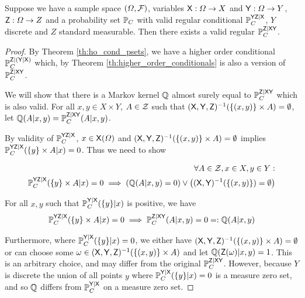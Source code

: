 \begin{theorem}
Suppose we have a sample space $(\Omega,\mathcal{F})$, variables $\mathsf{X}:\Omega\to X$ and $\mathsf{Y}:\Omega\to Y$, $\mathsf{Z}:\Omega\to Z$ and a probability set $\mathbb{P}_C$ with valid regular conditional $\mathbb{P}_C^{\mathsf{YZ}|\mathsf{X}}$, $Y$ discrete and $Z$ standard measurable. Then there exists a valid regular $\mathbb{P}_C^{\mathsf{Z}|\mathsf{XY}}$.
\end{theorem}

\begin{proof}
By Theorem \ref{th:ho_cond_psets}, we have a higher order conditional $\mathbb{P}_C^{\mathsf{Z}|(\mathsf{Y}|\mathsf{X})}$ which, by Theorem \ref{th:higher_order_conditionals} is also a version of $\mathbb{P}_C^{\mathsf{Z}|\mathsf{XY}}$.

We will show that there is a Markov kernel $\mathbb{Q}$ almost surely equal to $\mathbb{P}_C^{\mathsf{Z}|\mathsf{XY}}$ which is also valid. For all $x,y\in X\times Y$, $A\in\mathcal{Z}$ such that $(\mathsf{X},\mathsf{Y},\mathsf{Z})^{-1}(\{(x,y)\}\times A)=\emptyset$, let $\mathbb{Q}(A|x,y)=\mathbb{P}_C^{\mathsf{Z}|\mathsf{XY}}(A|x,y)$.

By validity of $\mathbb{P}_C^{\mathsf{YZ}|\mathsf{X}}$, $x\in \mathsf{X}(\Omega)$ and $(\mathsf{X},\mathsf{Y},\mathsf{Z})^{-1}(\{(x,y)\}\times A)=\emptyset$ implies $\mathbb{P}_C^{\mathsf{YZ}|\mathsf{X}}(\{y\}\times A|x)=0$. Thus we need to show

\begin{align}
    \forall A\in \mathcal{Z}, x\in X, y\in Y:\\ \mathbb{P}_C^{\mathsf{YZ}|\mathsf{X}}(\{y\}\times A|x)=0 \implies \left(\mathbb{Q}(A|x,y) = 0\right) \lor \left((\mathsf{X},\mathsf{Y})^{-1}(\{(x,y)\}) = \emptyset\right)
\end{align}

For all $x,y$ such that $\mathbb{P}_{C}^{\mathsf{Y}|\mathsf{X}}(\{y\}|x)$ is positive, we have
\begin{align}
    \mathbb{P}_C^{\mathsf{YZ}|\mathsf{X}}(\{y\}\times A|x)=0\implies \mathbb{P}_C^{\mathsf{Z}|\mathsf{XY}}(A|x,y)=0=:\mathbb{Q}(A|x,y)
\end{align}

Furthermore, where $\mathbb{P}_{C}^{\mathsf{Y}|\mathsf{X}}(\{y\}|x)=0$, we either have $(\mathsf{X},\mathsf{Y},\mathsf{Z})^{-1}(\{(x,y)\}\times A)= \emptyset$ or can choose some $\omega\in (\mathsf{X},\mathsf{Y},\mathsf{Z})^{-1}(\{(x,y)\}\times A)$ and let $\mathbb{Q}(\mathsf{Z}(\omega)|x,y) = 1$. This is an arbitrary choice, and may differ from the original $\mathbb{P}_C^{\mathsf{Z}|\mathsf{XY}}$. However, because $Y$ is discrete the union of all points $y$ where $\mathbb{P}_{C}^{\mathsf{Y}|\mathsf{X}}(\{y\}|x)=0$ is a measure zero set, and so $\mathbb{Q}$ differs from $\mathbb{P}_{C}^{\mathsf{Y}|\mathsf{X}}$ on a measure zero set.
\end{proof}

